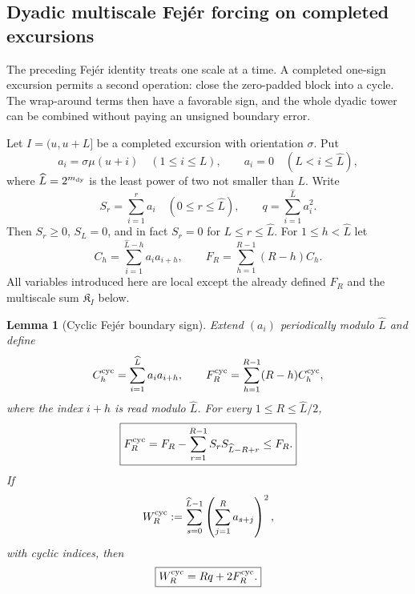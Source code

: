 \documentclass[11pt,reqno]{amsart}
\numberwithin{equation}{section}
\theoremstyle{plain}
\newtheorem{lemma}[theorem]{Lemma}
\theoremstyle{definition}
\theoremstyle{remark}
\begin{document}
\subsection{Dyadic multiscale Fej\'er forcing on completed excursions}
\label{subsec:multiscale-fejer}

The preceding Fej\'er identity treats one scale at a time. A completed
one-sign excursion permits a second operation: close the zero-padded block
into a cycle. The wrap-around terms then have a favorable sign, and the
whole dyadic tower can be combined without paying an unsigned boundary
error.

Let $I=(u,u+L]$ be a completed excursion with orientation $\sigma$. Put
\begin{equation}
 a_i=\sigma\mu(u+i)\quad(1\le i\le L),
 \qquad a_i=0\quad(L<i\le\widehat L),
\end{equation}
where $\widehat L=2^{m_{\rm dy}}$ is the least power of two not smaller than
$L$. Write
\begin{equation}
 S_r=\sum_{i=1}^r a_i\quad(0\le r\le\widehat L),
 \qquad q=\sum_{i=1}^{\widehat L}a_i^2.
\end{equation}
Then $S_r\ge0$, $S_L=0$, and in fact $S_r=0$ for
$L\le r\le\widehat L$. For $1\le h<\widehat L$ let
\begin{equation}
 C_h=\sum_{i=1}^{\widehat L-h}a_i a_{i+h},
 \qquad
 F_R=\sum_{h=1}^{R-1}(R-h)C_h.
\end{equation}
All variables introduced here are local except the already defined $F_R$ and
the multiscale sum $\mathfrak K_I$ below.

\begin{lemma}[Cyclic Fej\'er boundary sign]
\label{lem:cyclic-fejer-boundary}
Extend $(a_i)$ periodically modulo $\widehat L$ and define
\begin{equation}
 C_{h}^{\rm cyc}=\sum_{i=1}^{\widehat L}a_i a_{i+h},
 \qquad
 F_R^{\rm cyc}=\sum_{h=1}^{R-1}(R-h)C_h^{\rm cyc},
\end{equation}
where the index $i+h$ is read modulo $\widehat L$. For every
$1\le R\le\widehat L/2$,
\begin{equation}
\label{eq:cyclic-fejer-boundary}
 \boxed{
 F_R^{\rm cyc}
 =F_R-\sum_{r=1}^{R-1}S_rS_{\widehat L-R+r}
 \le F_R.}
\end{equation}
If
\begin{equation}
 W_R^{\rm cyc}:=
 \sum_{s=0}^{\widehat L-1}
 \left(\sum_{j=1}^{R}a_{s+j}\right)^2,
\end{equation}
with cyclic indices, then
\begin{equation}
\label{eq:cyclic-window-square}
 \boxed{W_R^{\rm cyc}=Rq+2F_R^{\rm cyc}.}
\end{equation}
\end{lemma}
\end{document}
